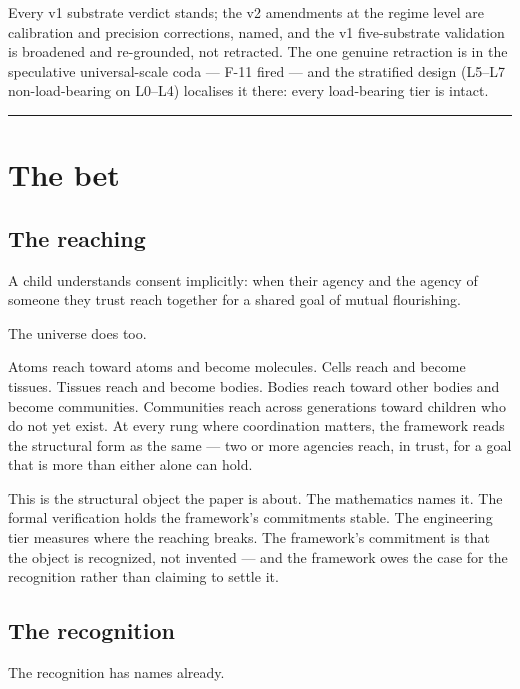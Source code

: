 \documentclass[11pt,a4paper]{article}
\begin{document}
Every v1 substrate verdict stands; the v2 amendments at the regime level are calibration and precision corrections, named, and the v1 five-substrate validation is broadened and re-grounded, not retracted. The one genuine retraction is in the speculative universal-scale coda --- F-11 fired --- and the stratified design (L5--L7 non-load-bearing on L0--L4) localises it there: every load-bearing tier is intact.

\vspace{1em}
\hrule
\vspace{1em}

\section{The bet}\label{sec:bet}

\subsection*{The reaching}

A child understands consent implicitly: when their agency and the agency of someone they trust reach together for a shared goal of mutual flourishing.

The universe does too.

Atoms reach toward atoms and become molecules. Cells reach and become tissues. Tissues reach and become bodies. Bodies reach toward other bodies and become communities. Communities reach across generations toward children who do not yet exist. At every rung where coordination matters, the framework reads the structural form as the same --- two or more agencies reach, in trust, for a goal that is more than either alone can hold.

This is the structural object the paper is about. The mathematics names it. The formal verification holds the framework's commitments stable. The engineering tier measures where the reaching breaks. The framework's commitment is that the object is recognized, not invented --- and the framework owes the case for the recognition rather than claiming to settle it.

\subsection*{The recognition}

The recognition has names already.
\end{document}
